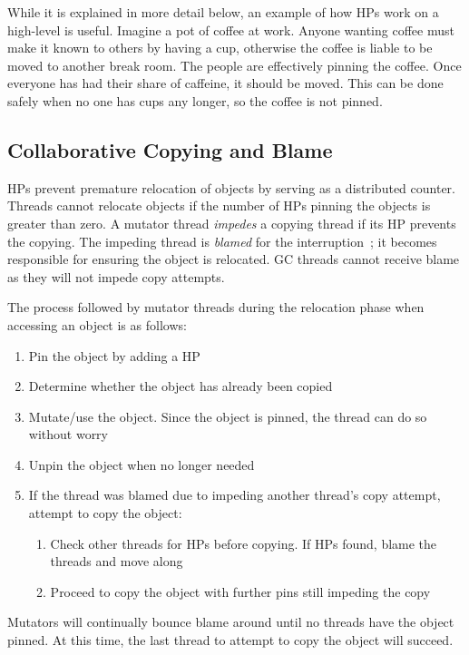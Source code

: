 \documentclass{sig-alternate}
\begin{document}
While it is explained in more detail below, an example of how HPs 
work on a high-level is useful. Imagine a pot of coffee at work. Anyone 
wanting coffee must make it known to others by having a cup, otherwise the 
coffee is liable to be moved to another break room. The people are effectively pinning the coffee.
Once everyone has had their share of caffeine, it should be moved. This can
be done safely when no one has cups any longer, so the coffee is not pinned.



\subsection{Collaborative Copying and Blame}
\label{sec:fppCopy}

HPs prevent premature relocation of objects by serving as a distributed
counter. Threads cannot relocate objects if the number of
HPs pinning the objects is greater than zero.
A mutator thread \emph{impedes} a copying thread if
its HP prevents the copying.
The impeding thread is \emph{blamed} for the 
interruption~\cite{Osterlund:FPP}; it becomes responsible for ensuring 
the object is relocated. GC threads cannot receive blame as they will not impede
copy attempts.

The process followed by mutator threads during the relocation phase when 
accessing an object is as follows:
\begin{enumerate}
\item Pin the object by adding a HP
\item Determine whether the object has already been copied
\item Mutate/use the object. Since the object is pinned, the thread can 
do so without worry
\item Unpin the object when no longer needed
\item If the thread was blamed due to impeding another thread's copy attempt, 
attempt to copy the object:
\begin{enumerate}
\item Check other threads for HPs before copying. If HPs found,
blame the threads and move along
\item Proceed to copy the object with further pins still impeding the copy
\end{enumerate}
\end{enumerate}
Mutators will continually bounce blame around until
no threads have the object pinned. At this time, the last thread
to attempt to copy the object will succeed.
\end{document}
